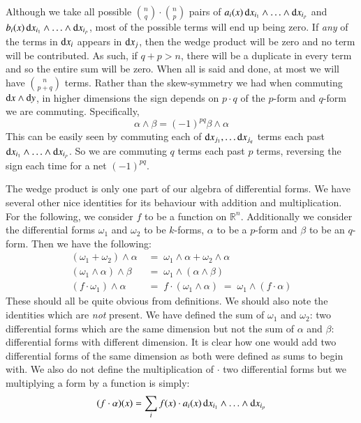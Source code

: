 Although we take all possible $\binom{n}{q} \cdot \binom{n}{p}$ pairs of 
$a_i (x) \mathop{}\!\mathrm{d} x_{i_1} \wedge \ldots \wedge \mathop{}\!\mathrm{d} x_{i_p}$ and $b_i (x) \mathop{}\!\mathrm{d} x_{i_1} \wedge \ldots \wedge \mathop{}\!\mathrm{d} x_{i_p}$,
most of the possible terms will end up being zero.
If \emph{any} of the terms in $\mathop{}\!\mathrm{d} x_{i}$ appears in $\mathop{}\!\mathrm{d} x_{j}$, then the wedge product will be zero 
and no term will be contributed.
As such, if $q+p > n$, there will be a duplicate in every term and so the entire sum will be zero.
When all is said and done, at most we will have $\binom{n}{p+q}$ terms.
Rather than the skew-symmetry we had when commuting $\mathop{}\!\mathrm{d} x \wedge \mathop{}\!\mathrm{d} y$, 
in higher dimensions the sign depends on $p \cdot q$ of the $p$-form and $q$-form we are commuting.
Specifically, 
\begin{equation}
	\alpha \wedge \beta = (-1)^{pq} \beta \wedge \alpha
\end{equation}
This can be easily seen by commuting each of $\mathop{}\!\mathrm{d} x_{j_1}, \ldots \mathop{}\!\mathrm{d} x_{j_q}$ terms each past 
$\mathop{}\!\mathrm{d} x_{i_1}\wedge \ldots \wedge \mathop{}\!\mathrm{d} x_{i_p}$. 
So we are commuting $q$ terms each past $p$ terms, reversing the sign each time for a net $(-1)^{pq}$.


The wedge product is only one part of our algebra of differential forms.
We have several other nice identities for its behaviour with addition and multiplication.
For the following, we consider $f$ to be a function on $\mathbb{R}^n$.
Additionally we consider the differential forms $\omega_1$ and $\omega_2$ to be $k$-forms, 
$\alpha$ to be a $p$-form and $\beta$ to be an $q$-form.
Then we have the following:
\begin{align}
	(\omega_1 + \omega_2) \wedge \alpha  & \;=\; \omega_1 \wedge \alpha + \omega_2 \wedge \alpha \\
	(\omega_1 \wedge \alpha) \wedge \beta & \;=\; \omega_1 \wedge ( \alpha \wedge \beta ) \\
	(f \cdot \omega_1) \wedge \alpha & \;=\;  f \cdot (\omega_1 \wedge \alpha) \;=\; \omega_1 \wedge (f \cdot \alpha)
\end{align}
These should all be quite obvious from definitions. 
We should also note the identities which are \emph{not} present.
We have defined the sum of $\omega_1$ and $\omega_2$: two differential forms which are the same dimension but not
the sum of $\alpha$ and $\beta$: differential forms with different dimension.
It is clear how one would add two differential forms of the same dimension as both were defined as sums to begin with.
We also do not define the multiplication of $\cdot$ two differential forms but we multiplying a form by a function is simply:
\begin{equation*}
	(f \cdot \alpha) (x) = \sum_i f(x)\cdot a_i(x) \mathop{}\!\mathrm{d} x_{i_1} \wedge \ldots \wedge \mathop{}\!\mathrm{d} x_{i_p}
\end{equation*}


